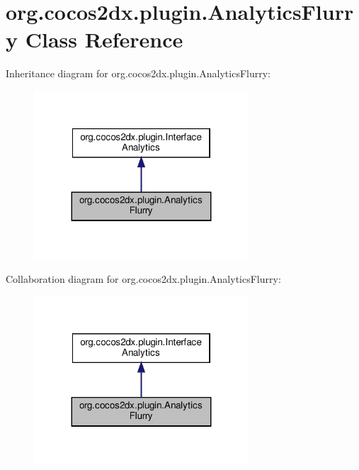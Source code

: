\hypertarget{classorg_1_1cocos2dx_1_1plugin_1_1AnalyticsFlurry}{}\section{org.\+cocos2dx.\+plugin.\+Analytics\+Flurry Class Reference}
\label{classorg_1_1cocos2dx_1_1plugin_1_1AnalyticsFlurry}


Inheritance diagram for org.\+cocos2dx.\+plugin.\+Analytics\+Flurry\+:
\nopagebreak
\begin{figure}[H]
\begin{center}
\leavevmode
\includegraphics[width=227pt]{classorg_1_1cocos2dx_1_1plugin_1_1AnalyticsFlurry__inherit__graph}
\end{center}
\end{figure}


Collaboration diagram for org.\+cocos2dx.\+plugin.\+Analytics\+Flurry\+:
\nopagebreak
\begin{figure}[H]
\begin{center}
\leavevmode
\includegraphics[width=227pt]{classorg_1_1cocos2dx_1_1plugin_1_1AnalyticsFlurry__coll__graph}
\end{center}
\end{figure}
